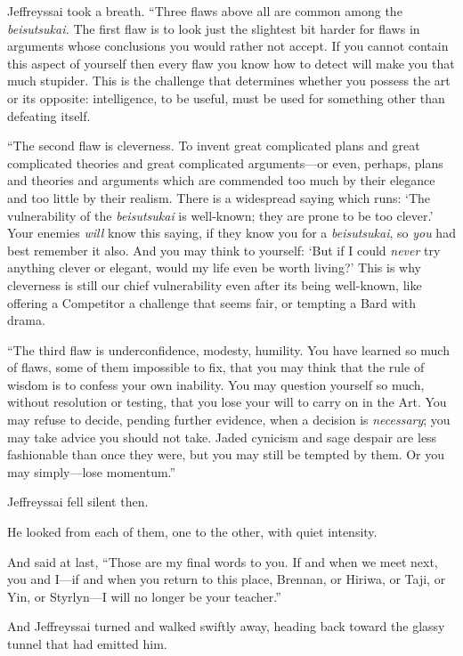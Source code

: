 {
 Jeffreyssai took a breath. ``Three flaws above
all are common among the \textit{beisutsukai.} The first flaw is to
look just the slightest bit harder for flaws in arguments whose
conclusions you would rather not accept. If you cannot contain this
aspect of yourself then every flaw you know how to detect will make you
that much stupider. This is the challenge that determines whether you
possess the art or its opposite: intelligence, to be useful, must be
used for something other than defeating itself.}

{
 ``The second flaw is cleverness. To invent great
complicated plans and great complicated theories and great complicated
arguments---or even, perhaps, plans and theories and arguments which
are commended too much by their elegance and too little by their
realism. There is a widespread saying which runs: `The
vulnerability of the \textit{beisutsukai} is well-known; they are prone
to be too clever.' Your enemies \textit{will} know this
saying, if they know you for a \textit{beisutsukai}, so \textit{you}
had best remember it also. And you may think to yourself:
`But if I could \textit{never} try anything clever or
elegant, would my life even be worth living?' This is
why cleverness is still our chief vulnerability even after its being
well-known, like offering a Competitor a challenge that seems fair, or
tempting a Bard with drama.}

{
 ``The third flaw is underconfidence, modesty,
humility. You have learned so much of flaws, some of them impossible to
fix, that you may think that the rule of wisdom is to confess your own
inability. You may question yourself so much, without resolution or
testing, that you lose your will to carry on in the Art. You may refuse
to decide, pending further evidence, when a decision is
\textit{necessary}; you may take advice you should not take. Jaded
cynicism and sage despair are less fashionable than once they were, but
you may still be tempted by them. Or you may simply---lose
momentum.''}

{
 Jeffreyssai fell silent then.}

{
 He looked from each of them, one to the other, with quiet
intensity.}

{
 And said at last, ``Those are my final words to
you. If and when we meet next, you and I---if and when you return to
this place, Brennan, or Hiriwa, or Taji, or Yin, or Styrlyn---I will no
longer be your teacher.''}

{
 And Jeffreyssai turned and walked swiftly away, heading back
toward the glassy tunnel that had emitted him.}

